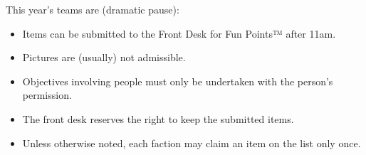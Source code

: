 
\vspace{1.8\baselineskip}

\begin{center} This year's teams are (dramatic pause): \end{center}

\vspace{\baselineskip}

\hfill
{}
  
\vspace{\baselineskip}
\hfill

\vspace{1.8\baselineskip}

\begin{itemize}[leftmargin=*, itemsep=-0.7\baselineskip]
\item Items can be submitted to the Front Desk for Fun Points™ after 11am.
\item Pictures are (usually) not admissible.
\item Objectives involving people must only be undertaken with the
  person’s permission.
\item The front desk reserves the right to keep the submitted items.
\item Unless otherwise noted, each faction may claim an item on the
  list only once.
\end{itemize}

